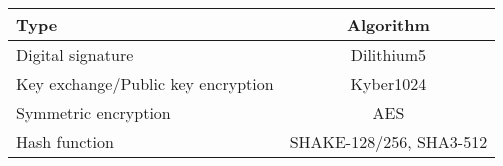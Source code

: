 \begin{tabular}{|l|c|}
  \hline
  Type                               & Algorithm               \\
  \hline
  Digital signature                  & Dilithium5              \\
  Key exchange/Public key encryption & Kyber1024               \\
  Symmetric encryption               & AES                     \\
  Hash function                      & SHAKE-128/256, SHA3-512 \\
  \hline
\end{tabular}
